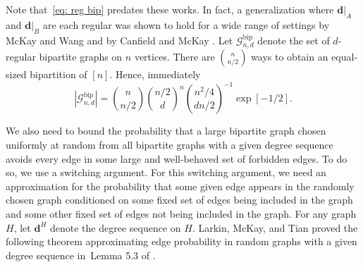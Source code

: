 \documentclass[11pt]{article}
\theoremstyle{plain}
\newtheorem{lem}[thm]{Lemma}
\newtheorem{cor}[thm]{Corollary}
\begin{document}
Note that~\eqref{eq: reg bip} predates these works. In fact, a generalization where $\mathbf d|_A$ and $\mathbf d|_B$ are each regular was shown to hold for a wide range of settings by McKay and Wang \cite{McKayWang2003} and by Canfield and McKay \cite{CanfieldMcKay2005}.
Let
    $\mathcal G_{n,d}^\text{bip}$ denote the set of $d$-regular bipartite graphs on $n$ vertices.
There are $\binom{n}{n/2}$ ways to obtain an equal-sized bipartition of $[n]$.
Hence, immediately
    \begin{equation}
    |\mathcal G_{n,d}^{\text{bip}}| =  \binom{n}{n/2}\binom{n/2}{d}^n\binom{n^2/4}{dn/2}^{-1}\exp[-1/2].\label{eq:reg bip count2}
    \end{equation}

We also need to bound the probability that a large bipartite graph chosen uniformly at random from all bipartite graphs with a given degree sequence avoids every edge in some large and well-behaved set of forbidden edges. To do so, we use a switching argument. For this switching argument, we need an approximation for the probability that some given edge appears in the randomly chosen graph conditioned on some fixed set of edges being included in the graph and some other fixed set of edges not being included in the graph. 
For any graph $H$, let $\mathbf{d}^H$ denote the degree sequence on $H$. Larkin, McKay, and Tian  proved the following theorem approximating edge probability in random graphs with a given degree sequence in~Lemma 5.3 of \cite{larkin2025subgraphs}.
\end{document}
